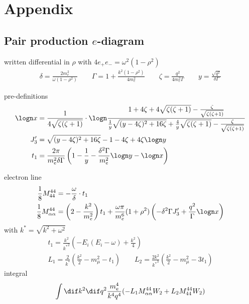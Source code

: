 \chapter{Appendix}

\section{Pair production $e$-diagram}

written differential in $\rho$ with $4 e_+ e_- = \omega^2 (1 - \rho^2)$
\begin{align}
    \delta = \frac{2 m_e^2}{\omega(1 - \rho^2)}
    \qquad
    \Gamma = 1 + \frac{k^2 (1 - \rho^2)}{4 m_e^2}
    \qquad
    \zeta = \frac{q^2}{4 m_e^2 \Gamma}
    \qquad
    y = \frac{\sqrt{q^2}}{\delta \Gamma}
\end{align}

pre-definitions
\begin{align}
    \logn x &= \frac{1}{4 \sqrt{\zeta(\zeta + 1)}} \cdot \logn \frac{1 + 4 \zeta + 4 \sqrt{\zeta(\zeta + 1)} - \frac{\zeta}{\sqrt{\zeta(\zeta + 1)}}}{\frac1y \sqrt{(y - 4\zeta)^2 + 16 \zeta} + \frac4y \sqrt{\zeta(\zeta + 1)} - \frac{\zeta}{\sqrt{\zeta(\zeta + 1)}}} \\
    J_3' &= \sqrt{(y - 4 \zeta)^2 + 16 \zeta} - 1 - 4\zeta + 4\zeta \logn y \\
    t_1 &= \frac{2 \pi}{m_e^2 \delta \Gamma}  \left( 1 - \frac1y - \frac{\delta^2 \Gamma}{m_e^2} \logn y - \logn x \right)
\end{align}

electron line
\begin{align}
    \frac{1}{8}M_{44}^{44} &= - \frac{\omega}{\delta} \cdot t_1 \\
    \frac{1}{8}M_{\alpha\alpha}^{44} &= \left(2 - \frac{k^2}{m_e^2}\right) t_1 + \frac{\omega \pi}{m_e^6} (1 + \rho^2) \left( -\delta^2 \Gamma J_3' + \frac{q^2}{\Gamma} \logn x \right) \\
\end{align}
with $k^\ast = \sqrt{k^2 + \omega^2}$
\begin{align}
    t_1 = \frac{k^2}{{k^\ast}^2} \left(-E_i (E_i - \omega) + \frac{k^2}{4} \right) \\
    L_1 = \frac{2}{k^\ast} \left( \frac{k^2}{2} - m_\mu^2 - t_1 \right)
    \qquad
    L_2 = \frac{2 k^2}{{k^\ast}^3} \left( \frac{k^2}{2} - m_\mu^2 - 3t_1 \right)
\end{align}
integral
\begin{align}
   \int \dif k^2 \dif q^2 \frac{m_e^4}{k^4 q^4} (- L_1 M_{\alpha\alpha}^{44} W_2 + L_2 M_{44}^{44} W_2)
\end{align}

